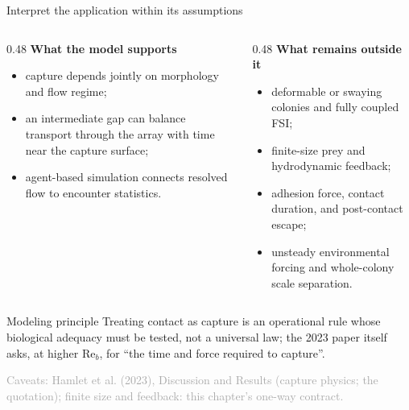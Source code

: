 \documentclass[aspectratio=169,11pt]{beamer}
\newcommand{\sourcecredit}[1]{\vfill\begin{flushright}\tiny\textcolor{DarkGray}{#1}\end{flushright}}
\begin{document}
\begin{frame}{Interpret the application within its assumptions}
\label{fr:assumptions}
\begin{columns}[T,onlytextwidth]
  \begin{column}{0.48\textwidth}
    \textbf{What the model supports}
    \begin{itemize}
      \item capture depends jointly on morphology and flow regime;
      \item an intermediate gap can balance transport through the array with time near the capture surface;
      \item agent-based simulation connects resolved flow to encounter statistics.
    \end{itemize}
  \end{column}
  \begin{column}{0.48\textwidth}
    \textbf{What remains outside it}
    \begin{itemize}
      \item deformable or swaying colonies and fully coupled FSI;
      \item finite-size prey and hydrodynamic feedback;
      \item adhesion force, contact duration, and post-contact escape;
      \item unsteady environmental forcing and whole-colony scale separation.
    \end{itemize}
  \end{column}
\end{columns}
\begin{block}{Modeling principle}
Treating contact as capture is an operational rule whose biological adequacy must be tested, not a universal law; the 2023 paper itself asks, at higher $\mathrm{Re}_b$, for ``the time and force required to capture''.
\end{block}
\sourcecredit{Caveats: Hamlet et al. (2023), Discussion and Results (capture physics; the quotation); finite size and feedback: this chapter's one-way contract.}
\end{frame}
\end{document}
